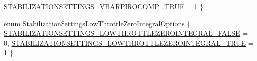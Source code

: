 \begin{DoxyCompactItemize}
\hyperlink{group___stabilization_settings_gga2beb2b7b221dd23c8ac18a075a18e571a64cbd0964a5a880e31b2bfb38cd53954}{\-S\-T\-A\-B\-I\-L\-I\-Z\-A\-T\-I\-O\-N\-S\-E\-T\-T\-I\-N\-G\-S\-\_\-\-V\-B\-A\-R\-P\-I\-R\-O\-C\-O\-M\-P\-\_\-\-T\-R\-U\-E} = 1
 \}
\item 
enum \hyperlink{group___stabilization_settings_ga52250f11a16b6beb8cad31ec1056d7ea}{\-Stabilization\-Settings\-Low\-Throttle\-Zero\-Integral\-Options} \{ \hyperlink{group___stabilization_settings_gga52250f11a16b6beb8cad31ec1056d7eaadab08362523722e9a3f929d9a41820ab}{\-S\-T\-A\-B\-I\-L\-I\-Z\-A\-T\-I\-O\-N\-S\-E\-T\-T\-I\-N\-G\-S\-\_\-\-L\-O\-W\-T\-H\-R\-O\-T\-T\-L\-E\-Z\-E\-R\-O\-I\-N\-T\-E\-G\-R\-A\-L\-\_\-\-F\-A\-L\-S\-E} = 0, 
\hyperlink{group___stabilization_settings_gga52250f11a16b6beb8cad31ec1056d7eaa4146c6b3e210eaf45b698bac367cf638}{\-S\-T\-A\-B\-I\-L\-I\-Z\-A\-T\-I\-O\-N\-S\-E\-T\-T\-I\-N\-G\-S\-\_\-\-L\-O\-W\-T\-H\-R\-O\-T\-T\-L\-E\-Z\-E\-R\-O\-I\-N\-T\-E\-G\-R\-A\-L\-\_\-\-T\-R\-U\-E} = 1
 \}
\end{DoxyCompactItemize}
